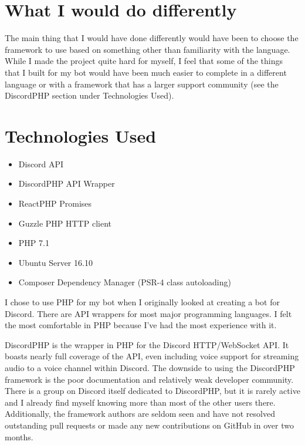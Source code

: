 \documentclass[12pt]{article} %
\begin{document}

\section*{What I would do differently}

The main thing that I would have done differently would have been to choose the framework to use based on something other than familiarity with the language. While I made the project quite hard for myself, I feel that some of the things that I built for my bot would have been much easier to complete in a different language or with a framework that has a larger support community (see the DiscordPHP section under Technologies Used).


\section*{Technologies Used}

\begin{itemize}
	\item Discord API
	\item DiscordPHP API Wrapper
	\item ReactPHP Promises
	\item Guzzle PHP HTTP client
	\item PHP 7.1
	\item Ubuntu Server 16.10
	\item Composer Dependency Manager (PSR-4 class autoloading)
\end{itemize}

I chose to use PHP for my bot when I originally looked at creating a bot for Discord. There are API wrappers for most major programming languages. I felt the most comfortable in PHP because I've had the most experience with it. 

DiscordPHP is the wrapper in PHP for the Discord HTTP/WebSocket API. It boasts nearly full coverage of the API, even including voice support for streaming audio to a voice channel within Discord. The downside to using the DiscordPHP framework is the poor documentation and relatively weak developer community. There is a group on Discord itself dedicated to DiscordPHP, but it is rarely active and I already find myself knowing more than most of the other users there. Additionally, the framework authors are seldom seen and have not resolved outstanding pull requests or made any new contributions on GitHub in over two months.
\end{document}
